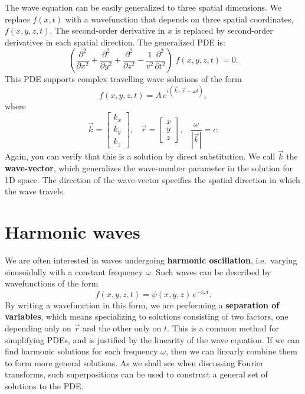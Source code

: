 \documentclass[10pt,a4paper]{article}
\begin{document}
The wave equation can be easily generalized to three spatial
dimensions.  We replace $f(x,t)$ with a wavefunction that depends on
three spatial coordinates, $f(x,y,z,t)$. The second-order derivative
in $x$ is replaced by second-order derivatives in each spatial
direction.  The generalized PDE is:
\begin{equation}
  \left(\frac{\partial^2}{\partial x^2} + \frac{\partial^2}{\partial y^2}
    + \frac{\partial^2}{\partial z^2}
    - \frac{1}{v^2} \frac{\partial^2}{\partial t^2}\right) \; f(x,y,z,t) = 0.
  \label{3dwave}
\end{equation}
This PDE supports complex travelling wave solutions of the form
\begin{equation}
  f(x,y,z,t) = A \, e^{i(\vec{k} \cdot \vec{r} - \omega t)},
\end{equation}
where
\begin{equation}
  \vec{k} = \begin{bmatrix}k_x\\k_y\\k_z\end{bmatrix}, \;\;\;
    \vec{r} = \begin{bmatrix}x\\y\\z\end{bmatrix},
      \;\;\;\frac{\omega}{\left|\vec{k}\right|} = c.
\end{equation}
Again, you can verify that this is a solution by direct
substitution. We call $\vec{k}$ the \textbf{wave-vector}, which
generalizes the wave-number parameter in the solution for 1D
space. The direction of the wave-vector specifies the spatial
direction in which the wave travels.

\section{Harmonic waves}
\label{harmonic-waves}

We are often interested in waves undergoing \textbf{harmonic
  oscillation}, i.e.~varying sinusoidally with a constant frequency
$\omega$. Such waves can be described by wavefunctions of the form
\begin{equation}
  f(x,y,z,t) = \psi(x,y,z) \, e^{-i\omega t}.
\end{equation}
By writing a wavefunction in this form, we are performing a
\textbf{separation of variables}, which means specializing to
solutions consisting of two factors, one depending only on $\vec{r}$
and the other only on $t$. This is a common method for simplifying
PDEs, and is justified by the linearity of the wave equation. If we
can find harmonic solutions for each frequency $\omega$, then we can
linearly combine them to form more general solutions. As we shall see
when discussing Fourier transforms, such superpositions can be used to
construct a general set of solutions to the PDE.
\end{document}
